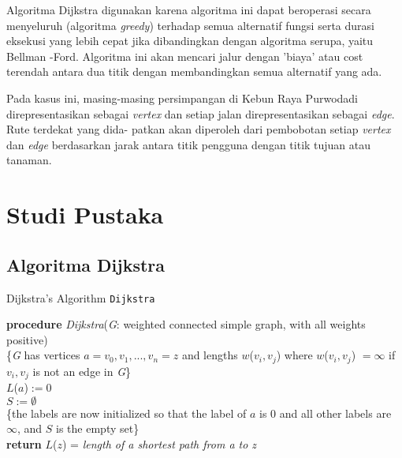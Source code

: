 \documentclass[conference]{IEEEtran}
\let\oldemptyset\emptyset
\let\emptyset\varnothing
\begin{document}
    Algoritma Dijkstra digunakan karena algoritma ini dapat
    beroperasi secara menyeluruh (algoritma \emph{greedy}) terhadap
    semua alternatif fungsi serta durasi eksekusi yang lebih cepat
    jika  dibandingkan  dengan  algoritma  serupa,  yaitu  Bellman
    -Ford.  Algoritma  ini  akan  mencari  jalur  dengan  ’biaya’  atau
    cost terendah antara dua titik dengan membandingkan semua
    alternatif yang ada.\par
    
    Pada kasus ini, masing-masing persimpangan di Kebun
    Raya Purwodadi direpresentasikan sebagai \emph{vertex} dan setiap
    jalan direpresentasikan sebagai \emph{edge}. Rute terdekat yang dida-
    patkan akan diperoleh dari pembobotan setiap \emph{vertex} dan \emph{edge}
    berdasarkan  jarak  antara  titik  pengguna  dengan  titik  tujuan
    atau tanaman.\par

\section{Studi Pustaka}

\subsection{Algoritma Dijkstra}

\begin{algorithm}
    \SetAlgoLined
    \DontPrintSemicolon
    \caption{Dijkstra's Algorithm \texttt{Dijkstra}}
    \textbf{procedure} \emph{Dijkstra}(\emph{G}: weighted connected simple
    graph, with all weights positive)\\
    \{\emph{G} has vertices $a = v_0, v_1, ..., v_n = z$ and lengths
    $w$($v_i, v_j$) where $w$($v_i, v_j$) $= \infty$ if $v_i, v_j$ is not an
    edge in \emph{G}\}\\
    $L$($a$)$ := 0$\\
    $S := \oldemptyset$\\
    \{the labels are now initialized so that the label of $a$ is
    0 and all other labels are $\infty$, and $S$ is the empty set\}\\
   \textbf{return} $L$($z$) = \textit{length of a shortest path from a to z}%
\end{algorithm}
\end{document}
